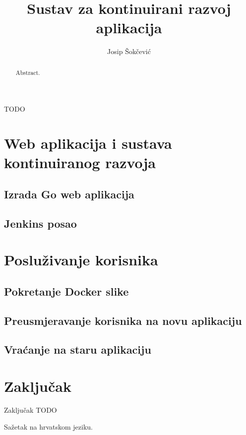 \documentclass[times, utf8, numeric, diplomski]{ferit}
\begin{document}
\title{Sustav za kontinuirani razvoj aplikacija}

\author{Josip Šokčević}
\maketitle

\izvornik{}

\zahvala{}
TODO

\tableofcontents





\chapter{Web aplikacija i sustava kontinuiranog razvoja}

\section{Izrada Go web aplikacija}

\section{Jenkins posao}

\chapter{Posluživanje korisnika}

\section{Pokretanje Docker slike}

\section{Preusmjeravanje korisnika na novu aplikaciju}

\section{Vraćanje na staru aplikaciju}

\chapter{Zaključak}
Zaključak TODO




\begin{sazetak}
Sažetak na hrvatskom jeziku.
\end{sazetak}

\begin{abstract}
Abstract.

\end{abstract}
\end{document}
